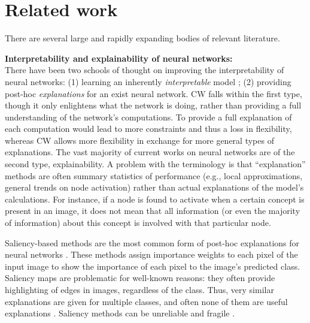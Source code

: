 \documentclass{article}
\begin{document}
\section{Related work}
\label{sec:related_work}
There are several large and rapidly expanding bodies of relevant literature.

\textbf{Interpretability and explainability of neural networks:}\\
There have been two schools of thought on improving the interpretability of neural networks: (1) learning an inherently \textit{interpretable} model \cite{Rudin2019}; (2) providing post-hoc \textit{explanations} for an exist neural network. CW falls within the first type, though it only enlightens what the network is doing, rather than providing a full understanding of the network's computations. To provide a full explanation of each computation would lead to more constraints and thus a loss in flexibility, whereas CW allows more flexibility in exchange for more general types of explanations. The vast majority of current works on neural networks are of the second type, explainability. A problem with the terminology is that ``explanation'' methods are often summary statistics of performance (e.g., local approximations, general trends on node activation) rather than actual explanations of the model's calculations. For instance, if a node is found to activate when a certain concept is present in an image, it does not mean that all information (or even the majority of information) about this concept is involved with that particular node. 


Saliency-based methods are the most common form of post-hoc explanations for neural networks \cite{zeiler2014visualizing, simonyan2013deep,smilkov2017smoothgrad,selvaraju2017grad}. These methods assign importance weights to each pixel of the input image to show the importance of each pixel to the image's predicted class. Saliency maps are problematic for well-known reasons: they often provide highlighting of edges in images, regardless of the class. Thus, very similar explanations are given for multiple classes, and often none of them are useful explanations \cite{Rudin2019}. 
Saliency methods can be unreliable and fragile \cite{adebayo2018sanity}.
\end{document}
